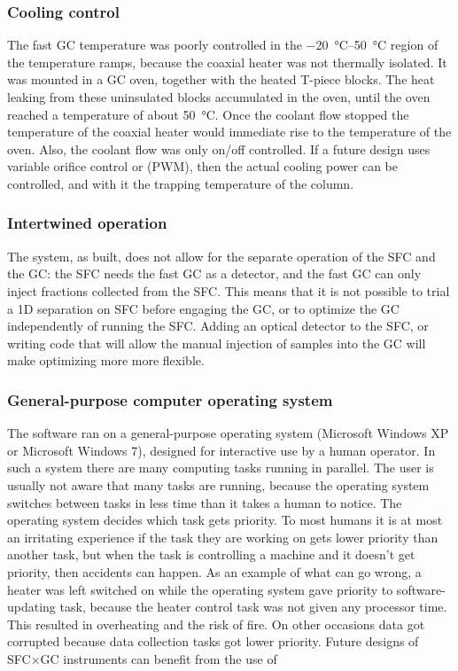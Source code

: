 \subsubsection{Cooling control}

The fast GC temperature was poorly controlled in the \SIrange{-20}{50}{\celsius}
region of the temperature ramps, because the coaxial heater was not thermally
isolated. It was mounted in a GC oven, together with the heated T-piece blocks.
The heat leaking from these uninsulated blocks accumulated in the oven, until
the oven reached a temperature of about \SI{50}{\celsius}. Once the coolant flow
stopped the temperature of the coaxial heater would immediate rise to the
temperature of the oven. Also, the coolant flow was only on/off controlled. If a
future design uses variable orifice control or  (PWM), then the actual cooling power can be controlled, and with it the
trapping temperature of the column.

\subsubsection{Intertwined operation}

The system, as built, does not allow for the separate operation of the SFC and
the GC: the SFC needs the fast GC as a detector, and the fast GC can only inject
fractions collected from the SFC. This means that it is not possible to trial a
1D separation on SFC before engaging the \twoD GC, or to optimize the GC
independently of running the SFC. Adding an optical detector to the SFC, or
writing code that will allow the manual injection of samples into the GC will
make optimizing more more flexible.

\subsubsection{General-purpose computer operating system}

The software ran on a general-purpose operating system (Microsoft Windows XP or
Microsoft Windows 7), designed for interactive use by a human operator. In such
a system there are many computing tasks running in parallel. The user is usually
not aware that many tasks are running, because the operating system switches
between tasks in less time than it takes a human to notice. The operating system
decides which task gets priority. To most humans it is at most an irritating
experience if the task they are working on gets lower priority than another
task, but when the task is controlling a machine and it doesn't get priority,
then accidents can happen. As an example of what can go wrong, a heater was left
switched on while the operating system gave priority to software-updating task,
because the heater control task was not given any processor time. This resulted
in overheating and the risk of fire. On other occasions data got corrupted
because data collection tasks got lower priority. Future designs of SFC×GC
instruments can benefit from the use of 

